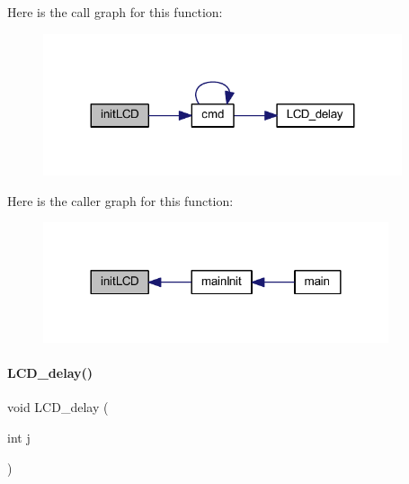 Here is the call graph for this function\+:
\nopagebreak
\begin{figure}[H]
\begin{center}
\leavevmode
\includegraphics[width=299pt]{a00032_a08529d00f32f8441dc7669b1a1d3783c_cgraph}
\end{center}
\end{figure}
Here is the caller graph for this function\+:
\nopagebreak
\begin{figure}[H]
\begin{center}
\leavevmode
\includegraphics[width=288pt]{a00032_a08529d00f32f8441dc7669b1a1d3783c_icgraph}
\end{center}
\end{figure}
\mbox{\label{a00032_a43354028a3c697c67905dc7e55e6de8d}} 
\paragraph{L\+C\+D\+\_\+delay()}
{\footnotesize\ttfamily void L\+C\+D\+\_\+delay (\begin{DoxyParamCaption}\item[{int}]{j }\end{DoxyParamCaption})}

